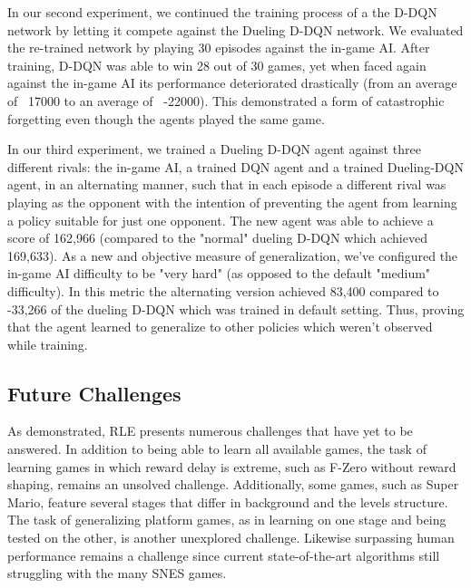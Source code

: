 \documentclass{article}
\begin{document}
In our second experiment, we continued the training process of a the D-DQN network by letting it compete against the Dueling D-DQN network. We evaluated the re-trained network by playing 30 episodes against the in-game AI. After training, D-DQN was able to win 28 out of 30 games, yet when faced again against the in-game AI its performance deteriorated drastically (from an average of ~17000 to an average of ~-22000). This demonstrated a form of catastrophic forgetting \citep{goodfellow2013empirical} even though the agents played the same game.


In our third experiment, we trained a Dueling D-DQN agent against three different rivals: the in-game AI, a trained DQN agent and a trained Dueling-DQN agent, in an alternating manner, such that in each episode a different rival was playing as the opponent with the intention of preventing the agent from learning a policy suitable for just one opponent.
The new agent was able to achieve a score of 162,966 (compared to the "normal" dueling D-DQN which achieved 169,633).
As a new and objective measure of generalization, we've configured the in-game AI difficulty to be "very hard" (as opposed to the default "medium" difficulty).
In this metric the alternating version achieved 83,400 compared to -33,266 of the dueling D-DQN which was trained in default setting. Thus, proving that the agent learned to generalize to other policies which weren't observed while training.


\subsection{Future Challenges}
As demonstrated, RLE presents numerous challenges that have yet to be answered. In addition to being able to learn all available games, the task of learning games in which reward delay is extreme, such as F-Zero without reward shaping, remains an unsolved challenge. 
Additionally, some games, such as Super Mario, feature several stages that differ in background and the levels structure. The task of generalizing platform games, as in learning on one stage and being tested on the other, is another unexplored challenge.
Likewise surpassing human performance remains a challenge since current state-of-the-art algorithms still struggling with the many SNES games.
\end{document}
